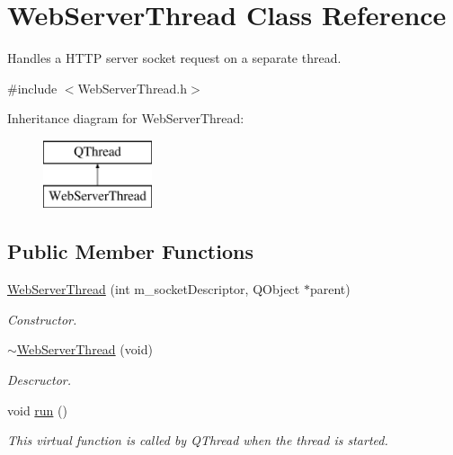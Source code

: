 \hypertarget{class_web_server_thread}{}\section{Web\+Server\+Thread Class Reference}
\label{class_web_server_thread}


Handles a H\+T\+TP server socket request on a separate thread.  




{\ttfamily \#include $<$Web\+Server\+Thread.\+h$>$}

Inheritance diagram for Web\+Server\+Thread\+:\begin{figure}[H]
\begin{center}
\leavevmode
\includegraphics[height=2.000000cm]{class_web_server_thread}
\end{center}
\end{figure}
\subsection*{Public Member Functions}
\begin{DoxyCompactItemize}
\item 
\mbox{\label{class_web_server_thread_a1cecaf23741442bf8d58577098d50fc0}} 
\hyperlink{class_web_server_thread_a1cecaf23741442bf8d58577098d50fc0}{Web\+Server\+Thread} (int m\+\_\+socket\+Descriptor, Q\+Object $\ast$parent)
\begin{DoxyCompactList}\small\item\em Constructor. \end{DoxyCompactList}\item 
\mbox{\label{class_web_server_thread_ad8a6737f8667fdc80edde982415ed14d}} 
\hyperlink{class_web_server_thread_ad8a6737f8667fdc80edde982415ed14d}{$\sim$\+Web\+Server\+Thread} (void)
\begin{DoxyCompactList}\small\item\em Descructor. \end{DoxyCompactList}\item 
\mbox{\label{class_web_server_thread_a301c2ed6e2d0c9a020089862e20b7da6}} 
void \hyperlink{class_web_server_thread_a301c2ed6e2d0c9a020089862e20b7da6}{run} ()
\begin{DoxyCompactList}\small\item\em This virtual function is called by Q\+Thread when the thread is started. \end{DoxyCompactList}\end{DoxyCompactItemize}


